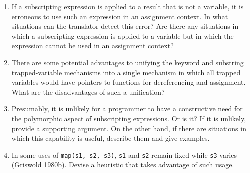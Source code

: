\begin{enumerate}
\begin{enumerate}
\item If a subscripting expression is applied to a result that is not
a variable, it is erroneous to use such an expression in an assignment
context. In what situations can the translator detect this error? Are
there any situations in which a subscripting expression is applied to
a variable but in which the expression cannot be used in an assignment
context?

\item There are some potential advantages to unifying the keyword and
substring trapped-variable mechanisms into a single mechanism in which
all trapped variables would have pointers to functions for
dereferencing and assignment. What are the disadvantages of such a
unification?

\item Presumably, it is unlikely for a programmer to have a
constructive need for the polymorphic aspect of subscripting
expressions. Or is it? If it is unlikely, provide a supporting
argument. On the other hand, if there are situations in which this
capability is useful, describe them and give examples.

\item In some uses of \texttt{map(s1, s2, s3)}, \texttt{s1} and
\texttt{s2} remain fixed while \texttt{s3} varies (Griswold
1980b). Devise a heuristic that takes advantage of such usage.

\end{enumerate}
\end{enumerate}
